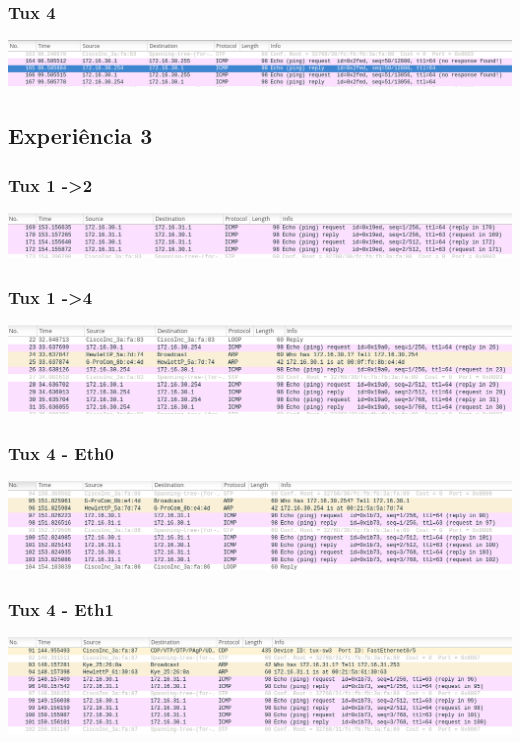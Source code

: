\documentclass[a4paper]{article}
\begin{document}
\subsubsection{Tux 4}
\includegraphics[scale=0.35]{Exp2-tux4.png}

\subsection{Experiência 3}
\subsubsection{Tux 1 -\textgreater 2}

\includegraphics[scale=0.35]{Exp3-Tux1-2.png}

\subsubsection{Tux 1 -\textgreater 4}

\includegraphics[scale=0.35]{Exp3-Tux1-4.png}

\subsubsection{Tux 4 - Eth0}

\includegraphics[scale=0.35]{Exp3-Tux4-eth0.png}

\subsubsection{Tux 4 - Eth1}

\includegraphics[scale=0.35]{Exp3-Tux4-eth1.png}
\end{document}
